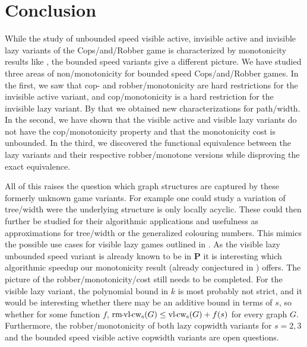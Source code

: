 \section{Conclusion}
While the study of unbounded speed visible active, invisible active and invisible lazy variants of the Cops\-/and\-/Robber game is characterized by monotonicity results like \cite{lapaugh1993recontamination}, the bounded speed variants give a different picture. We have studied three areas of non\-/monotonicity for bounded speed Cops\-/and\-/Robber games. In the first, we saw that cop- and robber\-/monotonicity are hard restrictions for the invisible active variant, and cop\-/monotonicity is a hard restriction for the invisible lazy variant. By that we obtained new characterizations for path\-/width. In the second, we have shown that the visible active and visible lazy variants do not have the cop\-/monotonicity property and that the monotonicity cost is unbounded.
In the third, we discovered the functional equivalence between the lazy variants and their respective robber\-/monotone versions while disproving the exact equivalence.

All of this raises the question which graph structures are captured by these formerly unknown game variants. For example one could study a variation of tree\-/width were the underlying structure is only locally acyclic. These could then further be studied for their algorithmic applications and usefulness as approximations for tree\-/width or the generalized colouring numbers. This mimics the possible use cases for visible lazy games outlined in \cite{doi:10.1137/090780006}. As the visible lazy unbounded speed variant is already known \cite{doi:10.1137/090780006} to be in $\mathbf{P}$ it is interesting which algorithmic speedup our monotonicity result (already conjectured in \cite{doi:10.1137/090780006}) offers.
The picture of the robber\-/monotonicity\-/cost still needs to be completed. For the visible lazy variant, the polynomial bound in $k$ is most probably not strict, and it would be interesting whether there may be an additive bound in terms of $s$, so whether for some function $f$, $\rmvlcopwidth{s}(G) \leq \vlcopwidth{s}(G) + f(s)$ for every graph $G$. Furthermore, the robber\-/monotonicity of both lazy copwidth variants for $s=2,3$ and the bounded speed visible active copwidth variants are open questions.
